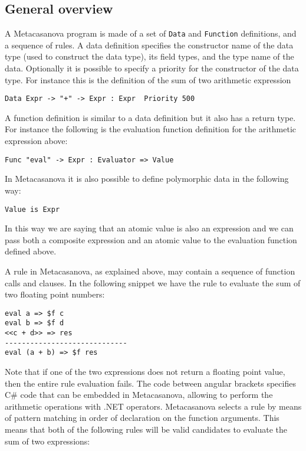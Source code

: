 \subsection{General overview}

A Metacasanova program is made of a set of \texttt{Data} and \texttt{Function} definitions, and a sequence of rules. A data definition specifies the constructor name of the data type (used to construct the data type), its field types, and the type name of the data. Optionally it is possible to specify a priority for the constructor of the data type. For instance this is the definition of the sum of two arithmetic expression

\begin{lstlisting}
Data Expr -> "+" -> Expr : Expr  Priority 500
\end{lstlisting}

\noindent
A function definition is similar to a data definition but it also has a return type. For instance the following is the evaluation function definition for the arithmetic expression above:

\begin{lstlisting}
Func "eval" -> Expr : Evaluator => Value
\end{lstlisting}

\noindent
In Metacasanova it is also possible to define polymorphic data in the following way:

\begin{lstlisting}
Value is Expr
\end{lstlisting}

\noindent
In this way we are saying that an atomic value is also an expression and we can pass both a composite expression and an atomic value to the evaluation function defined above.

A rule in Metacasanova, as explained above, may contain a sequence of function calls and clauses. In the following snippet we have the rule to evaluate the sum of two floating point numbers:

\begin{lstlisting}
eval a => $f c
eval b => $f d
<<c + d>> => res
-----------------------------
eval (a + b) => $f res
\end{lstlisting}

\noindent
Note that if one of the two expressions does not return a floating point value, then the entire rule evaluation fails. The code between angular brackets specifies C\# code that can be embedded in Metacasanova, allowing to perform the arithmetic operations with .NET operators. Metacasanova selects a rule by means of pattern matching in order of declaration on the function arguments. This means that both of the following rules will be valid candidates to evaluate the sum of two expressions:

